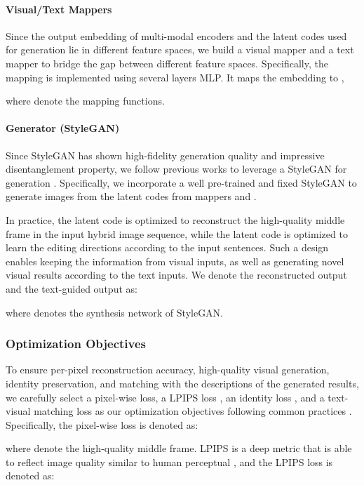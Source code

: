 \paragraph{Visual/Text Mappers} 
Since the output embedding  of multi-modal encoders and the latent codes  used for generation lie in different feature spaces, we build a visual mapper and a text mapper to bridge the gap between different feature spaces. Specifically, the mapping  is implemented using several layers MLP. It maps the embedding  to ,

where  denote the mapping functions.

\paragraph{Generator (StyleGAN)} 
Since StyleGAN has shown high-fidelity generation quality and impressive disentanglement property, we follow previous works to leverage a StyleGAN for generation \cite{xia2021tedigan,patashnik2021styleclip,karras2019stylegan}. Specifically, we incorporate a well pre-trained and fixed StyleGAN to generate images from the latent codes from mappers  and .

In practice, the latent code  is optimized to reconstruct the high-quality middle frame in the input hybrid image sequence, while the latent code  is optimized to learn the editing directions according to the input sentences. Such a design enables keeping the information from visual inputs, as well as generating novel visual results according to the text inputs. We denote the reconstructed output and the text-guided output as:


where  denotes the synthesis network of StyleGAN. 

\subsubsection{Optimization Objectives}
\label{sec:opt}
To ensure per-pixel reconstruction accuracy, high-quality visual generation, identity preservation, and matching with the descriptions of the generated results, we carefully select a pixel-wise  loss, a LPIPS loss \cite{zhang2018unreasonable}, an identity loss \cite{richardson2021psp}, and a text-visual matching loss as our optimization objectives following common practices \cite{tov2021designing,richardson2021psp,xia2021tedigan,patashnik2021styleclip}. Specifically, the pixel-wise  loss is denoted as: 

where  denote the high-quality middle frame.
LPIPS is a deep metric that is able to reflect image quality similar to human perceptual \cite{zhang2018unreasonable}, and the LPIPS loss is denoted as: 

